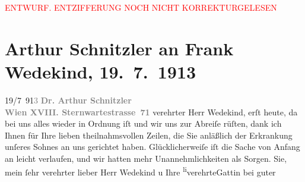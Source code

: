 
\begin{center}
            \textcolor{red}{ENTWURF. ENTZIFFERUNG NOCH NICHT KORREKTURGELESEN}
                      \end{center}
            
               \section[Arthur Schnitzler an Frank Wedekind, 19. 7. 1913]{ Arthur Schnitzler an Frank Wedekind, 19. 7. 1913}\nopagebreak{}\rehead{ }\begin{ledgroupsized}[t]{13cm}\normalsize\beginnumbering{} \toendnotes[C]{\smallbreak\pagebreak[2]} 
\toendnotes[C]{\smallbreak}\pstart
           \raggedleft{}19/7 91\textcolor{gray}{3}\pend
           \pstart
           {\pb}\textcolor{gray}{\textbf{Dr. Arthur Schnitzler}}{\\}\textcolor{gray}{\textbf{Wien XVIII. Sternwartestrasse 71}}\pend
           \pstart{}verehrter Herr Wedekind,\pend\pstart
           erſt heute, da bei uns alles wieder in Ordnung iſt und wir uns zur Abreiſe
                    rüſten, dank ich Ihnen für Ihre lieben theilnahmsvollen Zeilen, die Sie
                    anläßlich der Erkrankung unſeres Sohnes an uns gerich{\pb}tet haben. Glücklicherweiſe iſt die
                    Sache von Anfang an leicht verlaufen, und wir hatten mehr Unannehmlichkeiten als
                    Sorgen.\pend
           \pstart
           Sie, mein ſehr verehrter lieber Herr Wedekind u Ihre \substVorne{}\textsuperscript{li}\substDazwischen{}verehrte\substHinten{}{ }Gattin bei guter

\end{ledgroupsized}
